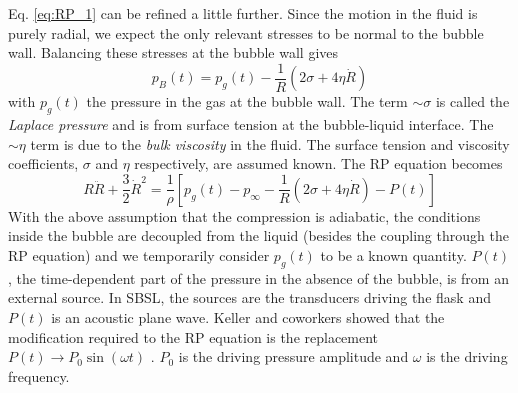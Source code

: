 \documentclass[11pt,prb,aps,nofootinbib,superscriptaddress,floatfix]{revtex4-2}
\begin{document}
Eq. \ref{eq:RP_1} can be refined a little further. Since the motion in the fluid is purely radial, we expect the only relevant stresses to be normal to the bubble wall. Balancing these stresses at the bubble wall gives \cite{brenner2002single,leighton2007derivation,prosperetti1999old,prosperetti1986bubble}
\begin{equation}
    p_B(t)=p_g(t)-\frac{1}{R}\left( 2\sigma+4\eta \dot{R} \right)
    \label{eq:p_B}
\end{equation}
with $p_g(t)$ the pressure in the gas at the bubble wall. The term $\sim\sigma$ is called the \emph{Laplace pressure} and is from surface tension at the bubble-liquid interface. The $\sim\eta$ term is due to the \emph{bulk viscosity} in the fluid. The surface tension and viscosity coefficients, $\sigma$ and $\eta$ respectively, are assumed known. The RP equation becomes
\begin{equation}
    R\ddot{R}+\frac{3}{2}\dot{R}^2 = \frac{1}{\rho} \left[ p_g(t)-p_\infty-\frac{1}{R}\left( 2\sigma+4\eta \dot{R} \right)-P(t) \right]
    \label{eq:RP_2}
\end{equation}
With the above assumption that the compression is adiabatic, the conditions inside the bubble are decoupled from the liquid (besides the coupling through the RP equation) and we temporarily consider $p_g(t)$ to be a known quantity. $P(t)$, the time-dependent part of the pressure in the absence of the bubble, is from an external source. In SBSL, the sources are the transducers driving the flask and $P(t)$ is an acoustic plane wave. Keller and coworkers showed that the modification required to the RP equation is the replacement $P(t) \rightarrow P_0 \sin(\omega t)$ \cite{keller1980bubble}. $P_0$ is the driving pressure amplitude and $\omega$ is the driving frequency.

\end{document}
